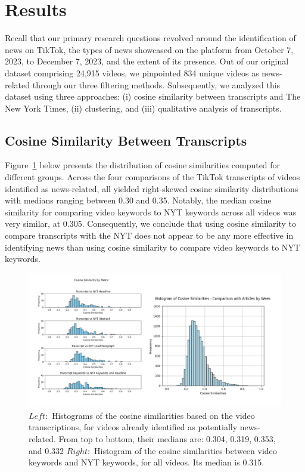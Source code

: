 \documentclass{article}
\begin{document}
\section{Results}
Recall that our primary research questions revolved around the identification of news on TikTok, the types of news showcased on the platform from October 7, 2023, to December 7, 2023, and the extent of its presence. Out of our original dataset comprising 24,915 videos, we pinpointed 834 unique videos as news-related through our three filtering methods. Subsequently, we analyzed this dataset using three approaches: (i) cosine similarity between transcripts and The New York Times, (ii) clustering, and (iii) qualitative analysis of transcripts. \newline

\subsection{Cosine Similarity Between Transcripts}
{\noindent}Figure~\ref{fig:transcription} below presents the distribution of cosine similarities computed for different groups. Across the four comparisons of the TikTok transcripts of videos identified as news-related, all yielded right-skewed cosine similarity distributions with medians ranging between 0.30 and 0.35. Notably, the median cosine similarity for comparing video keywords to NYT keywords across all videos was very similar, at 0.305. Consequently, we conclude that using cosine similarity to compare transcripts with the NYT does not appear to be any more effective in identifying news than using cosine similarity to compare video keywords to NYT keywords.\newline

\begin{figure}[h!]
    \centering
    \includegraphics[width=1\linewidth]{transcription.png} 
    \caption{$Left:$ Histograms of the cosine similarities based on the video transcriptions, for videos already identified as potentially news-related. From top to bottom, their medians are: 0.304, 0.319, 0.353, and 0.332 $Right:$ Histogram of the cosine similarities between video keywords and NYT keywords, for all videos. Its median is 0.315.}
    \label{fig:transcription} 
  \end{figure}
\end{document}
